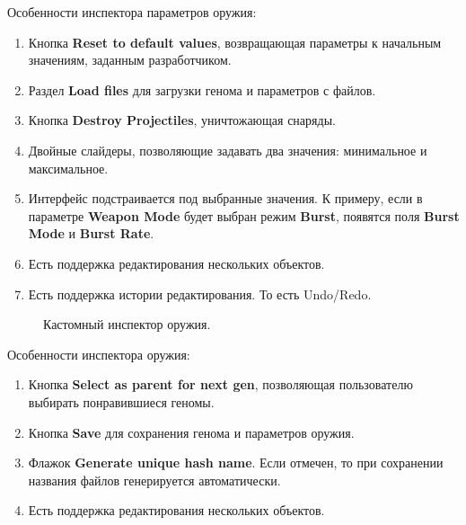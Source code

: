 Особенности инспектора параметров оружия:
\begin{enumerate}[label=\textbullet]
    \item Кнопка {\small \textbf{Reset to default values}}, возвращающая параметры к начальным значениям, заданным разработчиком.
    \item Раздел {\small \textbf{Load files}} для загрузки генома и параметров с файлов.
    \item Кнопка {\small \textbf{Destroy Projectiles}}, уничтожающая снаряды.
    \item Двойные слайдеры, позволяющие задавать два значения: минимальное и максимальное.
    \item Интерфейс подстраивается под выбранные значения. К примеру, если в параметре {\small \textbf{Weapon Mode}} будет выбран режим {\small \textbf{Burst}}, появятся поля {\small \textbf{Burst Mode}} и {\small \textbf{Burst Rate}}.
    \item Есть поддержка редактирования нескольких объектов.
    \item Есть поддержка истории редактирования. То есть Undo/Redo.
\end{enumerate}

\begin{figure}[ht]
    \begin{center}

        \caption{
            \label{SavingWeapon}
            Кастомный инспектор оружия.}
    \end {center}
\end {figure}

Особенности инспектора оружия:
\begin{enumerate}[label=\textbullet]
    \item Кнопка {\small \textbf{Select as parent for next gen}}, позволяющая пользователю выбирать понравившиеся геномы.
    \item Кнопка {\small \textbf{Save}} для сохранения генома и параметров оружия.
    \item Флажок {\small \textbf{Generate unique hash name}}. Если отмечен, то при сохранении названия файлов генерируется автоматически.
    \item Есть поддержка редактирования нескольких объектов.
\end{enumerate}


